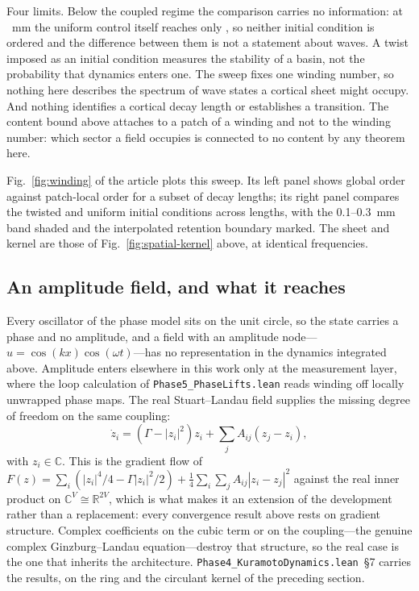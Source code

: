 \documentclass{article}
\begin{document}
Four limits. Below the coupled regime the comparison carries no information: at \waveSpreadShortDecay~mm the uniform control itself reaches only \waveSpreadShortControl, so neither initial condition is ordered and the difference between them is not a statement about waves. A twist imposed as an initial condition measures the stability of a basin, not the probability that dynamics enters one. The sweep fixes one winding number, so nothing here describes the spectrum of wave states a cortical sheet might occupy. And nothing identifies a cortical decay length or establishes a transition. The content bound above attaches to a patch of a winding and not to the winding number: which sector a field occupies is connected to no content by any theorem here.

Fig.~\ref{fig:winding} of the article plots this sweep. Its left panel shows global order against patch-local order for a subset of decay lengths; its right panel compares the twisted and uniform initial conditions across lengths, with the 0.1--0.3~mm band shaded and the interpolated retention boundary marked. The sheet and kernel are those of Fig.~\ref{fig:spatial-kernel} above, at identical frequencies.

\subsection{An amplitude field, and what it reaches}
\label{sec:supp-amplitude}

Every oscillator of the phase model sits on the unit circle, so the state carries a phase and no amplitude, and a field with an amplitude node---$u=\cos(kx)\cos(\omega t)$---has no representation in the dynamics integrated above. Amplitude enters elsewhere in this work only at the measurement layer, where the loop calculation of \nolinkurl{Phase5_PhaseLifts.lean} reads winding off locally unwrapped phase maps. The real Stuart--Landau field supplies the missing degree of freedom on the same coupling:
\begin{equation}
\dot z_i=(\Gamma-|z_i|^2)z_i+\sum_j A_{ij}(z_j-z_i),
\label{eq:amplitude-field}
\end{equation}
with $z_i\in\mathbb{C}$. This is the gradient flow of $F(z)=\sum_i(|z_i|^4/4-\Gamma|z_i|^2/2)+\tfrac14\sum_{i}\sum_{j}A_{ij}|z_i-z_j|^2$ against the real inner product on $\mathbb{C}^V\cong\mathbb{R}^{2V}$, which is what makes it an extension of the development rather than a replacement: every convergence result above rests on gradient structure. Complex coefficients on the cubic term or on the coupling---the genuine complex Ginzburg--Landau equation---destroy that structure, so the real case is the one that inherits the architecture. \nolinkurl{Phase4_KuramotoDynamics.lean}~\S7 carries the results, on the ring and the circulant kernel of the preceding section.
\end{document}
